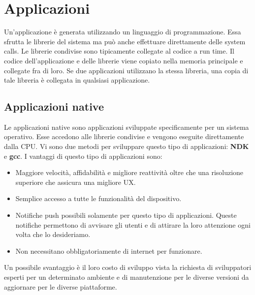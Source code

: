 \section{Applicazioni}
Un'applicazione è generata utilizzando un linguaggio di programmazione. Essa sfrutta le librerie del sistema ma può anche effettuare direttamente delle system calls. Le librerie condivise sono tipicamente collegate al codice a run time. Il codice dell'applicazione e delle librerie viene copiato nella memoria principale e collegate fra di loro. Se due applicazioni utilizzano la stessa libreria, una copia di tale libreria è collegata in qualsiasi applicazione.

\subsection{Applicazioni native}
Le applicazioni native sono applicazioni sviluppate specificamente per un sistema operativo. Esse accedono alle librerie condivise e vengono eseguite direttamente dalla CPU. Vi sono due metodi per sviluppare questo tipo di applicazioni: \textbf{NDK} e \textbf{gcc}. I vantaggi di questo tipo di applicazioni sono:
\begin{itemize}
    \item Maggiore velocità, affidabilità e migliore reattività oltre che una risoluzione superiore che assicura una migliore UX.
    \item Semplice accesso a tutte le funzionalità del dispositivo.
    \item Notifiche push possibili solamente per questo tipo di applicazioni. Queste notifiche permettono di avvisare gli utenti e di attirare la loro attenzione ogni volta che lo desideriamo.
    \item Non necessitano obbligatoriamente di internet per funzionare.
\end{itemize}

Un possibile svantaggio è il loro costo di sviluppo vista la richiesta di sviluppatori esperti per un determinato ambiente e di manutenzione per le diverse versioni da aggiornare per le diverse piattaforme.
